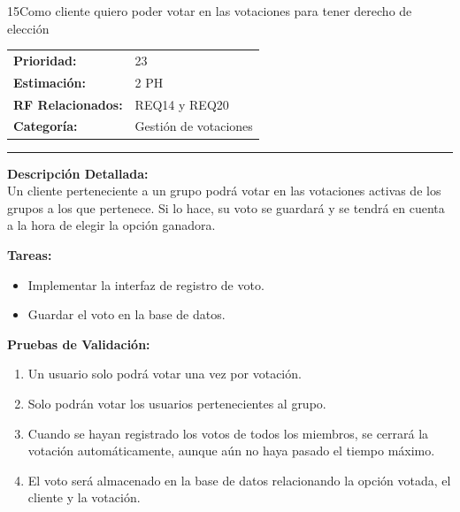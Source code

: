 \begin{hu_card}{15}{Como cliente quiero poder votar en las votaciones para tener derecho de elección}
    \begin{tabularx}{\linewidth}{l X}
        \textbf{Prioridad:}   & 23\\
        \textbf{Estimación:}  & 2 PH \\
        \textbf{RF Relacionados:} & REQ14 y REQ20\\
        \textbf{Categoría:} & Gestión de votaciones \\
    \end{tabularx}

    \vspace{2mm}
    \hrule
    \vspace{2mm}

    \textbf{Descripción Detallada:} \\
    Un cliente perteneciente a un grupo podrá votar en las votaciones activas de los grupos a los que pertenece. Si lo hace, su voto se guardará y se tendrá en cuenta a la hora de elegir la opción ganadora.

    \vspace{2mm}
    \textbf{Tareas:}
    \begin{itemize}[noitemsep, topsep=0pt]
        \item Implementar la interfaz de registro de voto.
        \item Guardar el voto en la base de datos.
    \end{itemize}

    \vspace{2mm}
    \textbf{Pruebas de Validación:}
    \begin{enumerate}[noitemsep, topsep=0pt]
        \item Un usuario solo podrá votar una vez por votación.
        \item Solo podrán votar los usuarios pertenecientes al grupo.
        \item Cuando se hayan registrado los votos de todos los miembros, se cerrará la votación automáticamente, aunque aún no haya pasado el tiempo máximo.
        \item El voto será almacenado en la base de datos relacionando la opción votada, el cliente y la votación.
    \end{enumerate}
\end{hu_card}

